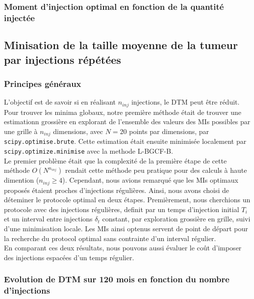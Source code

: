 \documentclass[12pt]{article}
\begin{document}
\subsubsection{Moment d'injection optimal en fonction de la quantité injectée}

\subsection[Injections répétées]{Minisation de la taille moyenne de la tumeur par injections répétées}
\subsubsection{Principes généraux}
L'objectif est de savoir si en réalisant $n_{inj}$ injections, le \ac{DTM} peut être réduit. 
Pour trouver les minima globaux, notre première méthode était de trouver une estimationn grossière en explorant de l'ensemble des valeurs des \acp{MI} possibles par une grille à $n_{inj}$ dimensions, avec $N=20$ points par dimensions, par \texttt{scipy.optimise.brute}. Cette estimation était ensuite  minimisée localement par \texttt{scipy.optimize.minimise} avec la methode L-BGCF-B\cite{}.\\
Le premier problème était que la complexité de la première étape de cette méthode $O({N}^{n_{inj}})$ rendait cette méthode peu pratique pour des calculs à haute dimention ($n_{inj}\geq4$). Cependant, nous avions remarqué que les \acp{MI} optimaux proposés étaient proches d'injections régulières. Ainsi, nous avons choisi de déteminer le protocole optimal en deux étapes. Premièrement, nous cherchions un protocole avec des injections régulières, definit par un temps d'injection initial $T_{i}$ et un interval entre injections $\delta_{t}$ constant, par exploration grossière en grille, suivi d'une minimisation locale. Les \acp{MI} ainsi optenus servent de point de départ pour la recherche du protocol optimal sans contrainte d'un interval régulier.\\
En comparant ces deux résultats, nous pouvons aussi évaluer le coût d'imposer des injections espacées d'un temps régulier.

\subsubsection{Evolution de \acf{DTM} sur 120 mois en fonction du nombre d'injections}
\subsubsection{}
\end{document}
